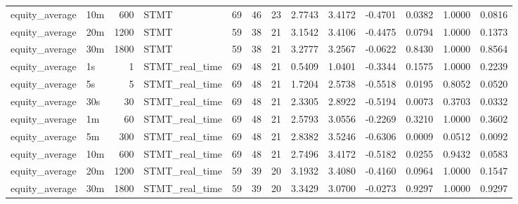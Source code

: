 \begin{tabular}{llrlrrrrrrrrr}
equity_average & 10m & 600 & STMT & 69 & 46 & 23 & 2.7743 & 3.4172 & -0.4701 & 0.0382 & 1.0000 & 0.0816 \\
equity_average & 20m & 1200 & STMT & 59 & 38 & 21 & 3.1542 & 3.4106 & -0.4475 & 0.0794 & 1.0000 & 0.1373 \\
equity_average & 30m & 1800 & STMT & 59 & 38 & 21 & 3.2777 & 3.2567 & -0.0622 & 0.8430 & 1.0000 & 0.8564 \\
equity_average & 1s & 1 & STMT_real_time & 69 & 48 & 21 & 0.5409 & 1.0401 & -0.3344 & 0.1575 & 1.0000 & 0.2239 \\
equity_average & 5s & 5 & STMT_real_time & 69 & 48 & 21 & 1.7204 & 2.5738 & -0.5518 & 0.0195 & 0.8052 & 0.0520 \\
equity_average & 30s & 30 & STMT_real_time & 69 & 48 & 21 & 2.3305 & 2.8922 & -0.5194 & 0.0073 & 0.3703 & 0.0332 \\
equity_average & 1m & 60 & STMT_real_time & 69 & 48 & 21 & 2.5793 & 3.0556 & -0.2269 & 0.3210 & 1.0000 & 0.3602 \\
equity_average & 5m & 300 & STMT_real_time & 69 & 48 & 21 & 2.8382 & 3.5246 & -0.6306 & 0.0009 & 0.0512 & 0.0092 \\
equity_average & 10m & 600 & STMT_real_time & 69 & 48 & 21 & 2.7496 & 3.4172 & -0.5182 & 0.0255 & 0.9432 & 0.0583 \\
equity_average & 20m & 1200 & STMT_real_time & 59 & 39 & 20 & 3.1932 & 3.4080 & -0.4160 & 0.0964 & 1.0000 & 0.1547 \\
equity_average & 30m & 1800 & STMT_real_time & 59 & 39 & 20 & 3.3429 & 3.0700 & -0.0273 & 0.9297 & 1.0000 & 0.9297 \\
\bottomrule
\end{tabular}
